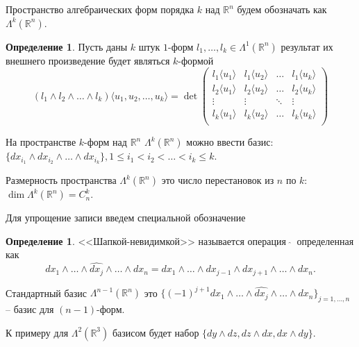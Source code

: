 \documentclass[a5paper]{article}
\newcounter{through}
\theoremstyle{plain}
\theoremstyle{definition}
\newtheorem{definition}[through]{Определение}
\numberwithin{through}{section}
\numberwithin{equation}{section}
\begin{document}
	Пространство алгебраических форм порядка $k$ над $\mathbb{R}^n$ будем обозначать как $\Lambda^k(\mathbb{R}^n)$.


\begin{definition}
	Пусть даны $k$ штук $1$-форм $l_1,\ldots,l_k \in \Lambda^1(\mathbb{R}^n)$ результат их внешнего произведение будет являться $k$-формой
	\begin{equation*}
		(l_1 \wedge l_2 \wedge \ldots \wedge l_k)\langle u_1, u_2,\ldots, u_k\rangle = \det 
		\begin{pmatrix}
		l_1\langle u_1 \rangle & l_1 \langle u_2 \rangle & \ldots &  l_1\langle u_k \rangle \\
		l_2\langle u_1 \rangle & l_2 \langle u_2 \rangle & \ldots &  l_2\langle u_k \rangle \\
		\vdots & \vdots & \ddots & \vdots \\ 
		l_k\langle u_1 \rangle & l_k \langle u_2 \rangle & \ldots &  l_k\langle u_k \rangle \\
		\end{pmatrix}
	\end{equation*}
\end{definition}

На пространстве $k$-форм над $\mathbb{R}^n$ $\Lambda^k(\mathbb{R}^n)$ можно ввести базис: $\{
dx_{i_1} \wedge dx_{i_2} \wedge\ldots\wedge dx_{i_k} \}, 1\leq i_1 < i_2 < \ldots < i_k \leq k$.

Размерность пространства $\Lambda^k(\mathbb{R}^n)$ это число перестановок из $n$ по $k$: $\dim \Lambda^k(\mathbb{R}^n) = 
C_n^k$.

Для упрощение записи введем специальной обозначение 

\begin{definition}
	<<Шапкой-невидимкой>> называется операция $\ \widehat{ } \ $ определенная как
	\[ dx_1 \wedge\ldots\wedge\widehat{dx_j}\wedge\ldots\wedge dx_n = dx_1 
	\wedge\ldots\wedge dx_{j-1}\wedge dx_{j+1}\wedge\ldots\wedge dx_n. \]
	
\end{definition}



Стандартный базис $\Lambda^{n-1}(\mathbb{R}^n)$ это 
$\{ (-1)^{j+1} dx_1\wedge\ldots\wedge \widehat{ dx_j } \wedge\ldots\wedge dx_n \}_{j = 1,\ldots,n}$
-- базис для $(n-1)$-форм.

К примеру для $\Lambda^2(\mathbb{R}^3)$ базисом будет набор $\{ dy\wedge dz, dz\wedge dx, dx\wedge dy \}$.

\medskip
\end{document}
